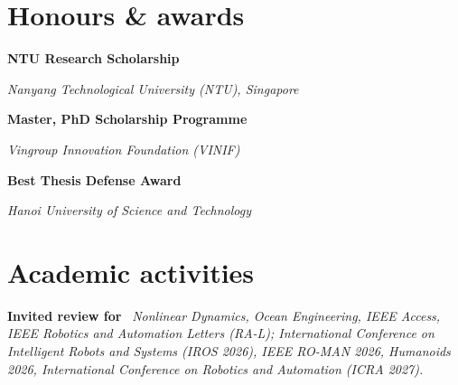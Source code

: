 \documentclass[10pt]{extarticle}
\newlength{\awardlabelwidth}
\newcommand{\award}[2]{%
	\noindent
	\parbox[t]{\awardlabelwidth}{\raggedright\textbf{#1}}%
	\hspace{0.75em}%
	\parbox[t]{\dimexpr\linewidth-\awardlabelwidth-0.75em\relax}{\textit{#2}}\par
	\vspace{0.5em}
}
\newcommand{\activities}[2]{%
	\noindent \textbf{#1} \,
	\noindent #2 \par
}
\begin{document}
	
	
	
	
	\section*{Honours \& awards}

	\award{NTU Research Scholarship}{Nanyang Technological University (NTU), Singapore}

	\award{Master, PhD Scholarship Programme}{Vingroup Innovation Foundation (VINIF)}

	\award{Best Thesis Defense Award}{Hanoi University of Science and Technology}
	

		\section*{Academic activities}
	\activities{Invited review for}
	{%
	\textit{Nonlinear Dynamics, Ocean Engineering, IEEE Access, IEEE Robotics and Automation Letters (RA-L); International Conference on Intelligent Robots and Systems (IROS 2026), IEEE RO-MAN 2026, Humanoids 2026, International Conference on Robotics and Automation (ICRA 2027).}
	}
	
	
\end{document}
